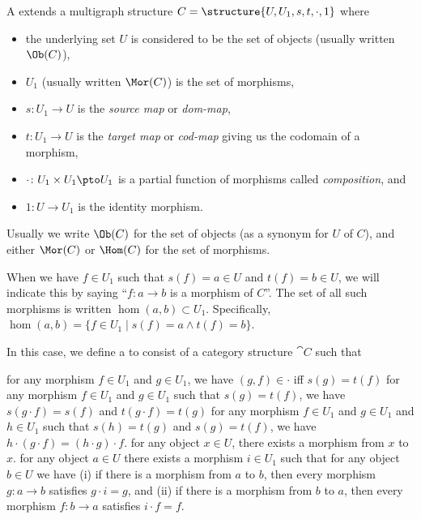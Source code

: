 \begin{definition}
A  extends a multigraph structure $C=\structure{U,U_{1},s,t,\cdot,1}$ where
\begin{itemize}
\item the underlying set $U$ is considered to be the set of objects
  (usually written $\Ob(C)$),
\item $U_{1}$ (usually written $\Mor(C)$) is the set of morphisms,
\item $s\colon U_{1}\to U$ is the \emph{source map} 
or \emph{dom-map},
\item $t\colon U_{1}\to U$ is the \emph{target map} or
\emph{cod-map} giving us the codomain of a morphism,
\item $\cdot\colon U_{1}\times U_{1}\pto U_{1}$ is a partial function
  of morphisms called \emph{composition}, and
\item $1\colon U\to U_{1}$ is the identity morphism.
\end{itemize}
Usually we write $\Ob(C)$ for the set of objects (as a synonym for $U$
of $C$), and either $\Mor(C)$ or $\Hom(C)$ for the set of morphisms.

When we have $f\in U_{1}$ such that $s(f)=a\in U$ and $t(f)=b\in U$,
we will indicate this by saying ``$f\colon a\to b$ is a morphism of $C$''.
The set of all such morphisms is written $\hom(a,b)\subset U_{1}$. Specifically,
$\hom(a,b)=\{f\in U_{1}\mid s(f)=a\land t(f)=b\}$.

In this case, we define a  to consist of a category
structure $\cat{C}$ such that
\begin{itemize}
 for any morphism $f\in U_{1}$ and $g\in U_{1}$,
  we have $(g,f)\in\cdot$ iff $s(g)=t(f)$
 for any morphism $f\in U_{1}$ and $g\in U_{1}$
  such that $s(g)=t(f)$, we have $s(g\cdot f)=s(f)$ and $t(g\cdot f)=t(g)$
 for any morphism $f\in U_{1}$ and $g\in U_{1}$
  and $h\in U_{1}$
  such that $s(h) = t(g)$ and $s(g)=t(f)$,
  we have $h\cdot(g\cdot f)=(h\cdot g)\cdot f$.
 for any object $x\in U$, there exists a morphism
  from $x$ to $x$.
 for any object $a\in U$ there exists a
  morphism $i\in U_{1}$ such that for any object $b\in U$ we have
  (i) if there is a morphism from $a$ to $b$, then every morphism
  $g\colon a\to b$ satisfies $g\cdot i=g$, and\hfill\break
  (ii) if there is a morphism from $b$ to $a$, then every morphism
  $f\colon b\to a$ satisfies $i\cdot f=f$.
\end{itemize}
\end{definition}

